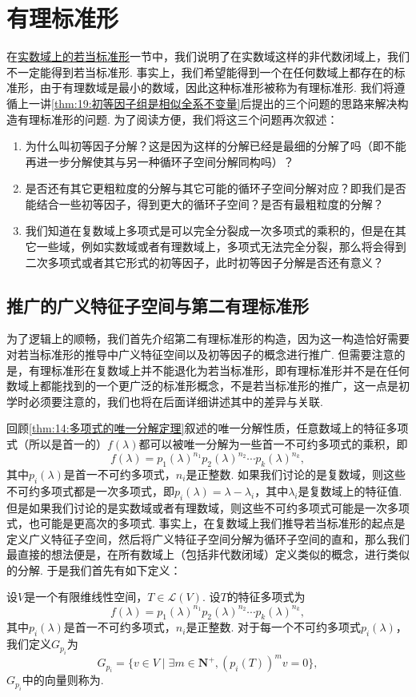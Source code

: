 \chapter{有理标准形}

在\hyperref[sec:18:实数域上的若当标准形]{实数域上的若当标准形}一节中，我们说明了在实数域这样的非代数闭域上，我们不一定能得到若当标准形. 事实上，我们希望能得到一个在任何数域上都存在的标准形，由于有理数域是最小的数域，因此这种标准形被称为有理标准形. 我们将遵循上一讲\autoref{thm:19:初等因子组是相似全系不变量}后提出的三个问题的思路来解决构造有理标准形的问题. 为了阅读方便，我们将这三个问题再次叙述：
\begin{enumerate}
    \item 为什么叫初等因子分解？这是因为这样的分解已经是最细的分解了吗（即不能再进一步分解使其与另一种循环子空间分解同构吗）？
    \item 是否还有其它更粗粒度的分解与其它可能的循环子空间分解对应？即我们是否能结合一些初等因子，得到更大的循环子空间？是否有最粗粒度的分解？
    \item 我们知道在复数域上多项式是可以完全分裂成一次多项式的乘积的，但是在其它一些域，例如实数域或者有理数域上，多项式无法完全分裂，那么将会得到二次多项式或者其它形式的初等因子，此时初等因子分解是否还有意义？
\end{enumerate}

\section{推广的广义特征子空间与第二有理标准形}
为了逻辑上的顺畅，我们首先介绍第二有理标准形的构造，因为这一构造恰好需要对若当标准形的推导中广义特征空间以及初等因子的概念进行推广. 但需要注意的是，有理标准形在复数域上并不能退化为若当标准形，即有理标准形并不是在任何数域上都能找到的一个更广泛的标准形概念，不是若当标准形的推广，这一点是初学时必须要注意的，我们也将在后面详细讲述其中的差异与关联.

回顾\autoref{thm:14:多项式的唯一分解定理}叙述的唯一分解性质，任意数域上的特征多项式（所以是首一的）$f(\lambda)$都可以被唯一分解为一些首一不可约多项式的乘积，即
\[f(\lambda)=p_1(\lambda)^{n_1}p_2(\lambda)^{n_2}\cdots p_k(\lambda)^{n_k},\]
其中$p_i(\lambda)$是首一不可约多项式，$n_i$是正整数. 如果我们讨论的是复数域，则这些不可约多项式都是一次多项式，即$p_i(\lambda)=\lambda-\lambda_i$，其中$\lambda_i$是复数域上的特征值. 但是如果我们讨论的是实数域或者有理数域，则这些不可约多项式可能是一次多项式，也可能是更高次的多项式. 事实上，在复数域上我们推导若当标准形的起点是定义广义特征子空间，然后将广义特征子空间分解为循环子空间的直和，那么我们最直接的想法便是，在所有数域上（包括非代数闭域）定义类似的概念，进行类似的分解. 于是我们首先有如下定义：
\begin{definition}
    设$V$是一个有限维线性空间，$T\in\mathcal{L}(V)$. 设$T$的特征多项式为
    \[f(\lambda)=p_1(\lambda)^{n_1}p_2(\lambda)^{n_2}\cdots p_k(\lambda)^{n_k},\]
    其中$p_i(\lambda)$是首一不可约多项式，$n_i$是正整数. 对于每一个不可约多项式$p_i(\lambda)$，我们定义$G_{p_i}$为
    \[G_{p_i}=\{v\in V\mid\exists m\in\mathbf{N}^+,(p_i(T))^mv=0\},\]
    $G_{p_i}$中的向量则称为.
\end{definition}


